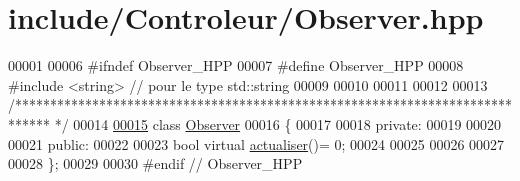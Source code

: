 \hypertarget{_observer_8hpp_source}{\section{include/\-Controleur/\-Observer.hpp}
}

\begin{DoxyCode}
00001 
00006 \textcolor{preprocessor}{#ifndef Observer\_HPP}
00007 \textcolor{preprocessor}{}\textcolor{preprocessor}{#define Observer\_HPP}
00008 \textcolor{preprocessor}{}\textcolor{preprocessor}{#include <string>} \textcolor{comment}{// pour le type std::string}
00009 
00010 
00011 
00012 
00013 \textcolor{comment}{/*****************************************************************************
      */}
00014 
\hypertarget{_observer_8hpp_source_l00015}{}\hyperlink{class_observer}{00015} \textcolor{keyword}{class }\hyperlink{class_observer}{Observer}
00016 \{
00017 
00018     \textcolor{keyword}{private}:
00019         
00020     
00021     \textcolor{keyword}{public}:
00022         
00023         \textcolor{keywordtype}{bool} \textcolor{keyword}{virtual} \hyperlink{class_observer_a7930233e1f70d67b3fece5d05e5b6299}{actualiser}()= 0;
00024         
00025         
00026         
00027         
00028 \};
00029 
00030 \textcolor{preprocessor}{#endif // Observer\_HPP      }
\end{DoxyCode}
